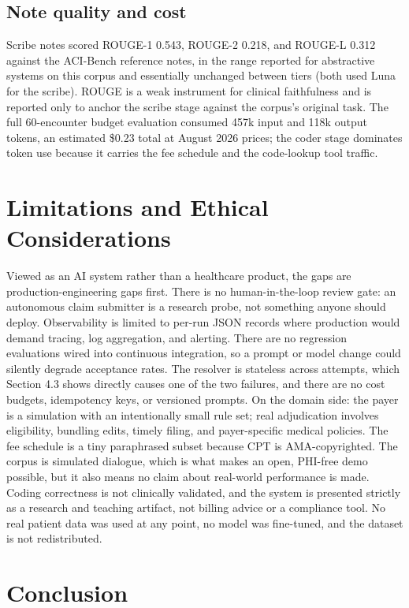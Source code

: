 \documentclass[sigconf,nonacm]{acmart}
\begin{document}
\subsection{Note quality and cost}
Scribe notes scored ROUGE-1 0.543, ROUGE-2 0.218, and ROUGE-L 0.312 against
the ACI-Bench reference notes, in the range reported for abstractive systems
on this corpus and essentially unchanged between tiers (both used Luna for
the scribe). ROUGE is a weak instrument for clinical faithfulness and is
reported only to anchor the scribe stage against the corpus's original task.
The full 60-encounter budget evaluation consumed 457k input and 118k output
tokens, an estimated \$0.23 total at August 2026 prices; the coder stage
dominates token use because it carries the fee schedule and the code-lookup
tool traffic.

\section{Limitations and Ethical Considerations}

Viewed as an AI system rather than a healthcare product, the gaps are
production-engineering gaps first. There is no human-in-the-loop review
gate: an autonomous claim submitter is a research probe, not something
anyone should deploy. Observability is limited to per-run JSON records
where production would demand tracing, log aggregation, and alerting.
There are no regression evaluations wired into continuous integration, so
a prompt or model change could silently degrade acceptance rates. The
resolver is stateless across attempts, which Section 4.3 shows directly
causes one of the two failures, and there are no cost budgets, idempotency
keys, or versioned prompts. On the domain side: the payer is a simulation
with an intentionally small rule set; real adjudication involves
eligibility, bundling edits, timely filing, and payer-specific medical
policies. The fee schedule is a tiny paraphrased subset because CPT is
AMA-copyrighted. The corpus is simulated dialogue, which is what makes an
open, PHI-free demo possible, but it also means no claim about real-world
performance is made. Coding correctness is not clinically validated, and
the system is presented strictly as a research and teaching artifact, not
billing advice or a compliance tool. No real patient data was used at any
point, no model was fine-tuned, and the dataset is not redistributed.

\section{Conclusion}
\end{document}
